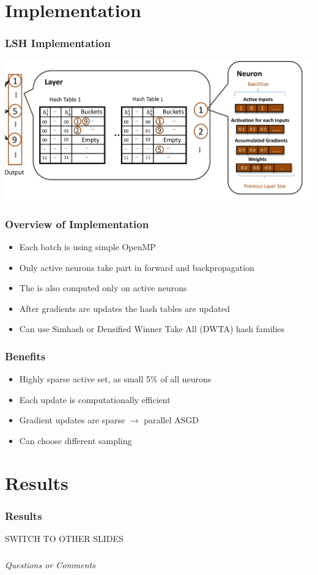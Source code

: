\documentclass{beamer}
\begin{document}
\section{Implementation}

\begin{frame}
    \frametitle{LSH Implementation}

    \centering
    \includegraphics[width=\textwidth]{images/SLIDE.png}
    

\end{frame}

\begin{frame}
    \frametitle{Overview of Implementation}
    \begin{itemize}
        \item Each batch is  using simple OpenMP
        \item Only active neurons take part in forward and backpropagation
        \item The  is also computed only on active neurons
        \item After gradients are updates the hash tables are updated
        \item Can use Simhash or Densified Winner Take All (DWTA) hash families
    \end{itemize}

\end{frame}

\begin{frame}
    \frametitle{Benefits}
    \begin{itemize}
        \item Highly sparse active set, as small 5\% of all neurons
        \item Each update is computationally efficient
        \item Gradient updates are sparse $\rightarrow$ parallel ASGD
        \item Can choose different sampling  
    \end{itemize}
    

\end{frame}
\section{Results}

\begin{frame}
    \frametitle{Results}
    SWITCH TO OTHER SLIDES
    

\end{frame}
\begin{frame}
    \frametitle{}

    \centering \Large
    \emph{Questions or Comments}

\end{frame}



\end{document}
